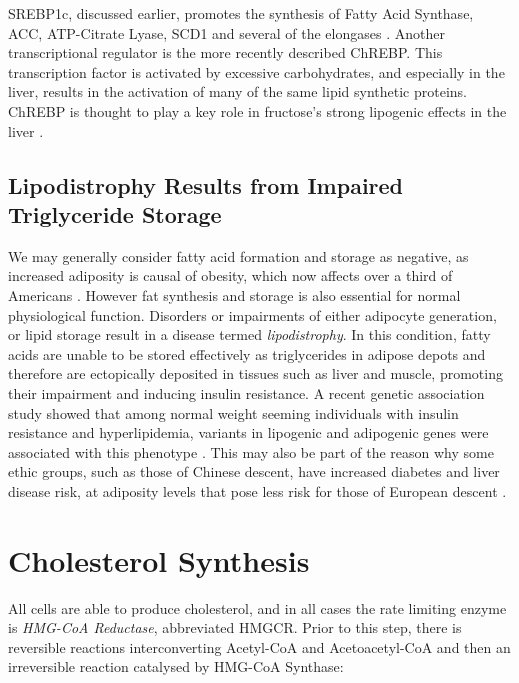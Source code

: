 \documentclass{tufte-handout}
\begin{document}
  SREBP1c, discussed earlier, promotes the synthesis of Fatty Acid Synthase, ACC, ATP-Citrate Lyase, SCD1 and several of the elongases \citep{Horton2002b,Moon2012b}.  Another transcriptional regulator is the more recently described ChREBP.  This transcription factor is activated by excessive carbohydrates, and especially in the liver, results in the activation of many of the same lipid synthetic proteins.  ChREBP is thought to play a key role in fructose's strong lipogenic effects in the liver \citep{Kim2016d}.

\subsection{Lipodistrophy Results from Impaired Triglyceride Storage}

We may generally consider fatty acid formation and storage as negative, as increased adiposity is causal of obesity, which now affects over a third of Americans \citep{Flegal2016}.  However fat synthesis and storage is also essential for normal physiological function.  Disorders or impairments of either adipocyte generation, or lipid storage result in a disease termed \emph{lipodistrophy}.  In this condition, fatty acids are unable to be stored effectively as triglycerides in adipose depots and therefore are ectopically deposited in tissues such as liver and muscle, promoting their impairment and inducing insulin resistance.  A recent genetic association study showed that among normal weight seeming individuals with insulin resistance and hyperlipidemia, variants in lipogenic and adipogenic genes were associated with this phenotype \citep{Lotta2016a}.  This may also be part of the reason why some ethic groups, such as those of Chinese descent, have increased diabetes and liver disease risk, at adiposity levels that pose less risk for those of European descent \citep{Chiu2011a}.

\section{Cholesterol Synthesis}

All cells are able to produce cholesterol, and in all cases the rate limiting enzyme is \emph{HMG-CoA Reductase}, abbreviated HMGCR.  Prior to this step, there is reversible reactions interconverting Acetyl-CoA and Acetoacetyl-CoA and then an irreversible reaction catalysed by HMG-CoA Synthase:
\end{document}

